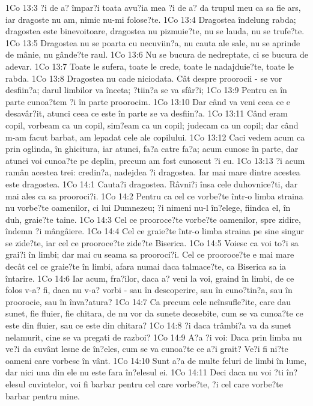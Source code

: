 1Co 13:3  ?i de a? împar?i toata avu?ia mea ?i de a? da trupul meu ca sa fie ars, iar dragoste nu am, nimic nu-mi folose?te.
1Co 13:4  Dragostea îndelung rabda; dragostea este binevoitoare, dragostea nu pizmuie?te, nu se lauda, nu se trufe?te.
1Co 13:5  Dragostea nu se poarta cu necuviin?a, nu cauta ale sale, nu se aprinde de mânie, nu gânde?te raul.
1Co 13:6  Nu se bucura de nedreptate, ci se bucura de adevar.
1Co 13:7  Toate le sufera, toate le crede, toate le nadajduie?te, toate le rabda.
1Co 13:8  Dragostea nu cade niciodata. Cât despre proorocii - se vor desfiin?a; darul limbilor va înceta; ?tiin?a se va sfâr?i;
1Co 13:9  Pentru ca în parte cunoa?tem ?i în parte proorocim.
1Co 13:10  Dar când va veni ceea ce e desavâr?it, atunci ceea ce este în parte se va desfiin?a.
1Co 13:11  Când eram copil, vorbeam ca un copil, sim?eam ca un copil; judecam ca un copil; dar când m-am facut barbat, am lepadat cele ale copilului.
1Co 13:12  Caci vedem acum ca prin oglinda, în ghicitura, iar atunci, fa?a catre fa?a; acum cunosc în parte, dar atunci voi cunoa?te pe deplin, precum am fost cunoscut ?i eu.
1Co 13:13  ?i acum ramân acestea trei: credin?a, nadejdea ?i dragostea. Iar mai mare dintre acestea este dragostea.
1Co 14:1  Cauta?i dragostea. Râvni?i însa cele duhovnice?ti, dar mai ales ca sa prooroci?i.
1Co 14:2  Pentru ca cel ce vorbe?te într-o limba straina nu vorbe?te oamenilor, ci lui Dumnezeu; ?i nimeni nu-l în?elege, fiindca el, în duh, graie?te taine.
1Co 14:3  Cel ce prooroce?te vorbe?te oamenilor, spre zidire, îndemn ?i mângâiere.
1Co 14:4  Cel ce graie?te într-o limba straina pe sine singur se zide?te, iar cel ce prooroce?te zide?te Biserica.
1Co 14:5  Voiesc ca voi to?i sa grai?i în limbi; dar mai cu seama sa prooroci?i. Cel ce prooroce?te e mai mare decât cel ce graie?te în limbi, afara numai daca talmace?te, ca Biserica sa ia întarire.
1Co 14:6  Iar acum, fra?ilor, daca a? veni la voi, graind în limbi, de ce folos v-a? fi, daca nu v-a? vorbi - sau în descoperire, sau în cuno?tin?a, sau în proorocie, sau în înva?atura?
1Co 14:7  Ca precum cele neînsufle?ite, care dau sunet, fie fluier, fie chitara, de nu vor da sunete deosebite, cum se va cunoa?te ce este din fluier, sau ce este din chitara?
1Co 14:8  ?i daca trâmbi?a va da sunet nelamurit, cine se va pregati de razboi?
1Co 14:9  A?a ?i voi: Daca prin limba nu ve?i da cuvânt lesne de în?eles, cum se va cunoa?te ce a?i grait? Ve?i fi ni?te oameni care vorbesc în vânt.
1Co 14:10  Sunt a?a de multe feluri de limbi în lume, dar nici una din ele nu este fara în?elesul ei.
1Co 14:11  Deci daca nu voi ?ti în?elesul cuvintelor, voi fi barbar pentru cel care vorbe?te, ?i cel care vorbe?te barbar pentru mine.
